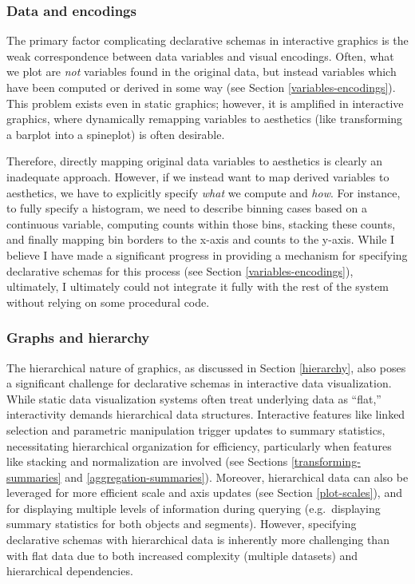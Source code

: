\documentclass[
  openany]{book}
\theoremstyle{definition}
\theoremstyle{definition}
\theoremstyle{definition}
\theoremstyle{definition}
\theoremstyle{remark}
\begin{document}
\subsubsection{Data and encodings}\label{data-and-encodings}

The primary factor complicating declarative schemas in interactive graphics is the weak correspondence between data variables and visual encodings. Often, what we plot are \emph{not} variables found in the original data, but instead variables which have been computed or derived in some way (see Section \ref{variables-encodings}). This problem exists even in static graphics; however, it is amplified in interactive graphics, where dynamically remapping variables to aesthetics (like transforming a barplot into a spineplot) is often desirable.

Therefore, directly mapping original data variables to aesthetics is clearly an inadequate approach. However, if we instead want to map derived variables to aesthetics, we have to explicitly specify \emph{what} we compute and \emph{how}. For instance, to fully specify a histogram, we need to describe binning cases based on a continuous variable, computing counts within those bins, stacking these counts, and finally mapping bin borders to the x-axis and counts to the y-axis. While I believe I have made a significant progress in providing a mechanism for specifying declarative schemas for this process (see Section \ref{variables-encodings}), ultimately, I ultimately could not integrate it fully with the rest of the system without relying on some procedural code.

\subsubsection{Graphs and hierarchy}\label{graphs-and-hierarchy}

The hierarchical nature of graphics, as discussed in Section \ref{hierarchy}, also poses a significant challenge for declarative schemas in interactive data visualization. While static data visualization systems often treat underlying data as ``flat,'' interactivity demands hierarchical data structures. Interactive features like linked selection and parametric manipulation trigger updates to summary statistics, necessitating hierarchical organization for efficiency, particularly when features like stacking and normalization are involved (see Sections \ref{transforming-summaries} and \ref{aggregation-summaries}). Moreover, hierarchical data can also be leveraged for more efficient scale and axis updates (see Section \ref{plot-scales}), and for displaying multiple levels of information during querying (e.g.~displaying summary statistics for both objects and segments). However, specifying declarative schemas with hierarchical data is inherently more challenging than with flat data due to both increased complexity (multiple datasets) and hierarchical dependencies.
\end{document}
